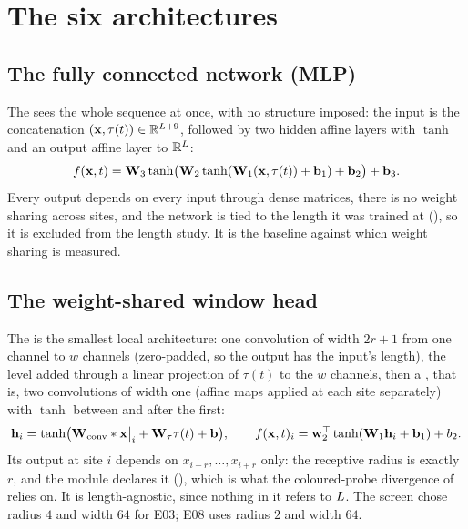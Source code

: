\section{The six architectures}
\label{sec:archs}

\subsection{The fully connected network (MLP)}

The  sees the whole sequence at once, with no structure
imposed: the input is the concatenation $(\mathbf{x},\tau(t))\in\mathbb{R}^{L+9}$, followed by
two hidden affine layers with $\tanh$ and an output affine layer to $\mathbb{R}^{L}$:
\begin{equation}
  f(\mathbf{x},t)=\mathbf{W}_3\tanh\bigl(\mathbf{W}_2\tanh(\mathbf{W}_1(\mathbf{x},\tau(t))+\mathbf{b}_1)+\mathbf{b}_2\bigr)+\mathbf{b}_3 .
\end{equation}
Every output depends on every input through dense matrices, there is no weight sharing
across sites, and the network is tied to the length it was trained at (), so it is excluded from the length study. It is the baseline against which
weight sharing is measured.

\subsection{The weight-shared window head}

The  is the smallest local architecture: one convolution of width
$2r+1$ from one channel to $w$ channels (zero-padded, so the output has the input's
length), the level added through a linear projection of $\tau(t)$ to the $w$ channels,
then a , that is, two convolutions of width one (affine maps applied
at each site separately) with $\tanh$ between and after the first:
\begin{equation}
  \mathbf{h}_i=\tanh\bigl(\mathbf{W}_{\mathrm{conv}}\ast\mathbf{x}\big|_i+\mathbf{W}_\tau\tau(t)+\mathbf{b}\bigr),\qquad
  f(\mathbf{x},t)_i=\mathbf{w}_2^\top\tanh(\mathbf{W}_1\mathbf{h}_i+\mathbf{b}_1)+b_2 .
\end{equation}
Its output at site $i$ depends on $x_{i-r},\dots,x_{i+r}$ only: the receptive radius is
exactly $r$, and the module declares it (), which is what
the coloured-probe divergence of  relies on. It is length-agnostic,
since nothing in it refers to $L$. The screen chose radius $4$ and width $64$ for
E03; E08 uses radius $2$ and width $64$.

